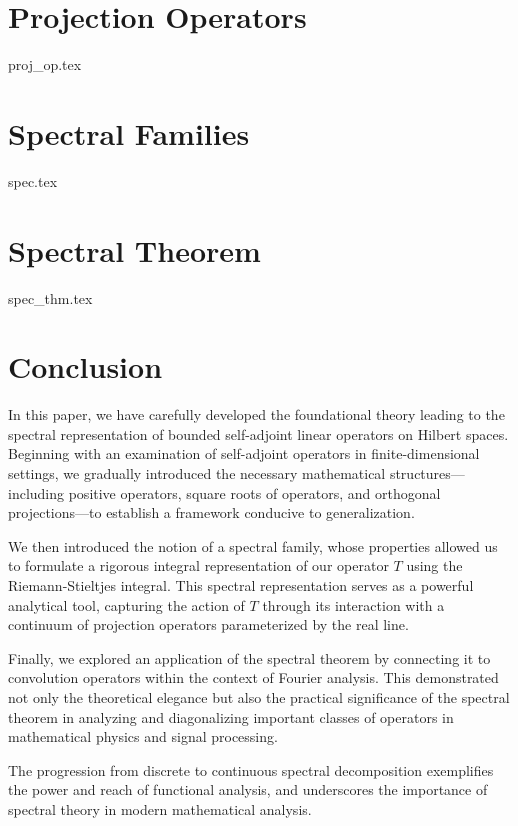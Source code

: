 \documentclass[a4paper]{article}
\begin{document}
\section{Projection Operators}\label{section 5}

{proj_op.tex}

\section{Spectral Families}\label{section 6}

{spec.tex}

\section{Spectral Theorem}\label{section 7}

{spec_thm.tex}

\section{Conclusion}

    In this paper, we have carefully developed the foundational theory leading to the spectral representation of bounded self-adjoint linear operators on Hilbert spaces. Beginning with an examination of self-adjoint operators in finite-dimensional settings, we gradually introduced the necessary mathematical structures—including positive operators, square roots of operators, and orthogonal projections—to establish a framework conducive to generalization.

We then introduced the notion of a spectral family, whose properties allowed us to formulate a rigorous integral representation of our operator \( T \) using the Riemann-Stieltjes integral. This spectral representation serves as a powerful analytical tool, capturing the action of \( T \) through its interaction with a continuum of projection operators parameterized by the real line.

Finally, we explored an application of the spectral theorem by connecting it to convolution operators within the context of Fourier analysis. This demonstrated not only the theoretical elegance but also the practical significance of the spectral theorem in analyzing and diagonalizing important classes of operators in mathematical physics and signal processing.

The progression from discrete to continuous spectral decomposition exemplifies the power and reach of functional analysis, and underscores the importance of spectral theory in modern mathematical analysis.
\end{document}
